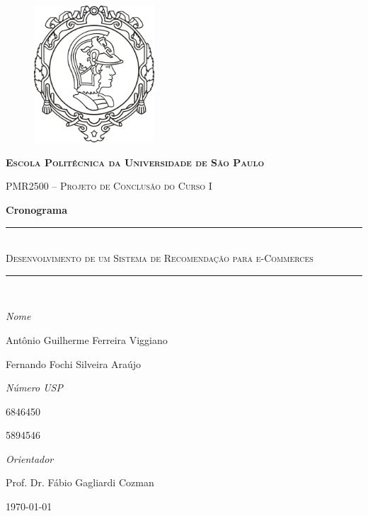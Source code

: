 \begin{center}
\begin{figure}[ht]
    \begin{center}
    \includegraphics[width=0.4\textwidth]{img/logo_poli}
    \end{center}
    \label{logo_poli}
\end{figure}
\end{center}

\begin{center}
\textbf{\textsc{Escola Politécnica da Universidade de São Paulo}}

\textsc{PMR2500 -- Projeto de Conclusão do Curso I}

\textbf{\Large Cronograma}
\end{center}
\begin{center}
\vspace{2cm}
\hrule  ~\\[0.5cm]
{ \huge \textsc{Desenvolvimento de um Sistema de Recomendação para e-Commerces}}\\[0.8cm]

\hrule  ~\\[0.5cm]

\end{center}


\vfill

\begin{minipage}{0.65\textwidth} 
	\large\emph{Nome} 
	
	\large{Antônio Guilherme Ferreira Viggiano}
		
	\large{Fernando Fochi Silveira Araújo}  

\end{minipage}
\begin{minipage}{0.35\textwidth} 
	\large\emph{Número USP}
	
	6846450
	
	5894546
\end{minipage}

\vfill

\begin{center}
	\large\emph{Orientador}

	\large{Prof. Dr. Fábio Gagliardi Cozman}
\end{center}

\vfill

\begin{center}
	\today
\end{center}
